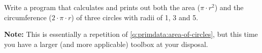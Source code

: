 Write a program that calculates and prints out both the area  ($\pi \cdot r^2$) and the circumference ($2 \cdot \pi \cdot r$) of three circles with radii of 1, 3 and 5.

\textbf{Note:} This is essentially a repetition of \ref{q:primdata:area-of-circles}, but this time you have a larger (and more applicable) toolbox at your disposal.

